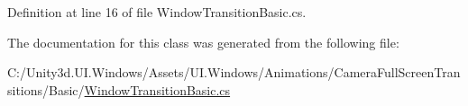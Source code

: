 Definition at line 16 of file Window\+Transition\+Basic.\+cs.



The documentation for this class was generated from the following file\+:\begin{DoxyCompactItemize}
\item 
C\+:/\+Unity3d.\+U\+I.\+Windows/\+Assets/\+U\+I.\+Windows/\+Animations/\+Camera\+Full\+Screen\+Transitions/\+Basic/\hyperlink{_window_transition_basic_8cs}{Window\+Transition\+Basic.\+cs}\end{DoxyCompactItemize}
